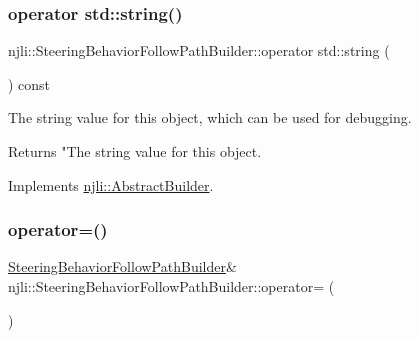 \subsubsection{\texorpdfstring{operator std\+::string()}{operator std::string()}}
{\footnotesize\ttfamily njli\+::\+Steering\+Behavior\+Follow\+Path\+Builder\+::operator std\+::string (\begin{DoxyParamCaption}{ }\end{DoxyParamCaption}) const\hspace{0.3cm}{\ttfamily [virtual]}}

The string value for this object, which can be used for debugging.

\begin{DoxyReturn}{Returns}
"The string value for this object. 
\end{DoxyReturn}


Implements \mbox{\hyperlink{classnjli_1_1_abstract_builder_a3e6e553e06d1ca30517ad5fb0bd4d000}{njli\+::\+Abstract\+Builder}}.

\mbox{\label{classnjli_1_1_steering_behavior_follow_path_builder_a4e2217746bd8711bfa714cea642fab2b}} 
\subsubsection{\texorpdfstring{operator=()}{operator=()}}
{\footnotesize\ttfamily \mbox{\hyperlink{classnjli_1_1_steering_behavior_follow_path_builder}{Steering\+Behavior\+Follow\+Path\+Builder}}\& njli\+::\+Steering\+Behavior\+Follow\+Path\+Builder\+::operator= (\begin{DoxyParamCaption}\item[{const \mbox{\hyperlink{classnjli_1_1_steering_behavior_follow_path_builder}{Steering\+Behavior\+Follow\+Path\+Builder}} \&}]{ }\end{DoxyParamCaption})\hspace{0.3cm}{\ttfamily [protected]}}

\mbox{\label{classnjli_1_1_steering_behavior_follow_path_builder_a9d6694c1eb17a4e47c0c56b4652b737e}} 
